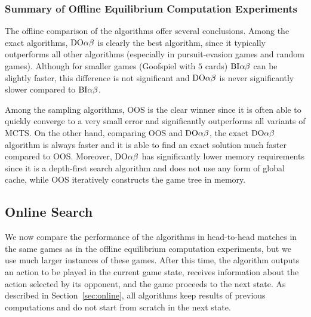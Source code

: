\subsubsection{Summary of Offline Equilibrium Computation Experiments}

The offline comparison of the algorithms offer several conclusions.
Among the exact algorithms, $\textrm{DO}\alpha\beta$ is clearly the best algorithm, since it typically outperforms all other algorithms (especially in pursuit-evasion games and random games). Although for smaller games (\eg Goofspiel with $5$ cards)  $\textrm{BI}\alpha\beta$ can be slightly faster, this difference is not significant and $\textrm{DO}\alpha\beta$ is never significantly slower compared to $\textrm{BI}\alpha\beta$. %

Among the sampling algorithms, OOS is the clear winner since it is often able to quickly converge to a very small error and significantly outperforms all variants of MCTS.
On the other hand, comparing OOS and $\textrm{DO}\alpha\beta$, the exact $\textrm{DO}\alpha\beta$ algorithm is always faster and it is able to find an exact solution much faster compared to OOS.
Moreover, $\textrm{DO}\alpha\beta$ has significantly lower memory requirements since it is a depth-first search algorithm and does not use any form of global cache, while OOS iteratively constructs the game tree in memory.

\subsection{Online Search}

We now compare the performance of the algorithms in head-to-head matches in the same games as in the offline equilibrium computation experiments, but we use much larger instances of these games.  After this time, the algorithm outputs an action to be played in the current game state, receives information about the action selected by its opponent, and the game proceeds to the next state. As described in Section~\ref{sec:online}, all algorithms keep results of previous computations and do not start from scratch in the next state. 

